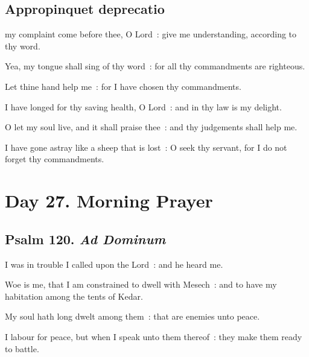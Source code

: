\subsection{Appropinquet deprecatio}


 my complaint come before thee, O Lord~: give me understanding, according to thy word.\par
{}
Yea, my tongue shall sing of thy word~: for all thy commandments are righteous.\par
{}Let thine hand help me~: for I have chosen thy commandments.\par
{}I have longed for thy saving health, O Lord~: and in thy law is my delight.\par
{}O let my soul live, and it shall praise thee~: and thy judgements shall help me.\par
{}I have gone astray like a sheep that is lost~: O seek thy servant, for I do not forget thy commandments.\par

\section*{Day 27. Morning Prayer}

\subsection{Psalm 120. \textit{Ad Dominum}}


 I was in trouble I called upon the Lord~: and he heard me.\par
{}
Woe is me, that I am constrained to dwell with Mesech~: and to have my habitation among the tents of Kedar.\par
{}My soul hath long dwelt among them~: that are enemies unto peace.\par
{}I labour for peace, but when I speak unto them thereof~: they make them ready to battle.\par

